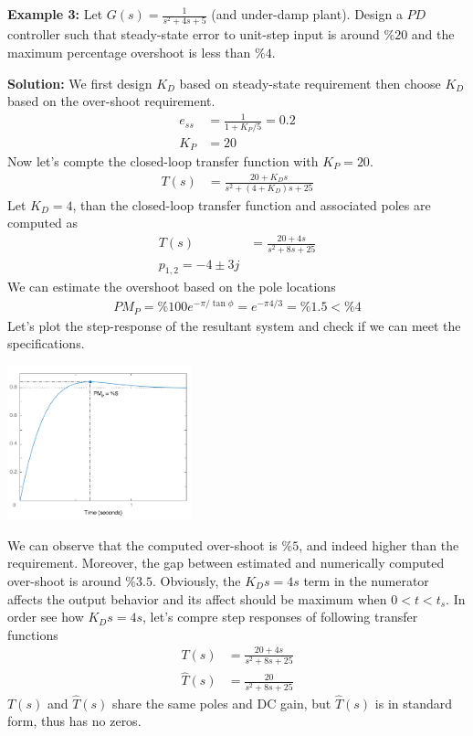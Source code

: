 \documentclass[twoside]{article}
\begin{document}
\textbf{Example 3:} Let $G(s) = \frac{1}{s^2 + 4 s + 5}$ (and under-damp
plant). Design a $PD$ controller such that steady-state error to
unit-step input is around $\% 20$ and the maximum percentage overshoot
is less than $\% 4$. 

\textbf{Solution:} We first design $K_D$ based on steady-state
requirement then choose $K_D$ based on the over-shoot requirement.
%
  \begin{align*}
    e_{ss} &= \frac{1}{1 + K_P/5} = 0.2
    \\
   K_P &= 20
  \end{align*} 
%
Now let's compte the closed-loop transfer function with $K_P = 20$.
  \begin{align*}
   T(s) &= \frac{20 + K_D s}{s^2 + (4 + K_D) s + 25}
  \end{align*} 
%
Let $K_D = 4$, than the closed-loop transfer function and associated
poles are computed as
%
  \begin{align*}
   T(s) &= \frac{20 + 4s}{s^2 + 8 s + 25}
  \\
  p_{1,2} = -4 \pm 3 j
  \end{align*} 
% 
We can estimate the overshoot based on the pole locations
%
  \begin{align*}
    PM_P = \% 100 e^{-\pi / \tan \phi} = e^{-\pi 4 / 3} = \% 1.5 < \% 4
  \end{align*} 
%
Let's plot the step-response of the resultant system and check if we
can meet the specifications.

\vspace{12 pt}

  \begin{minipage}[h]{1\linewidth}
    \begin{center}
      \includegraphics[width=0.4\textwidth]{PD1}
    \end{center}
  \end{minipage}

\vspace{12 pt}

We can observe that the computed over-shoot is $\% 5$, and indeed
higher than the requirement. Moreover, the gap between estimated
and numerically computed over-shoot is around $\%3.5$. Obviously,
the $K_D s = 4 s$ term in the numerator affects the output behavior and
its affect should be maximum when $0 < t < t_s$. In order see how
$K_D s = 4 s$, let's compre step responses of following transfer
functions
%
\begin{align*}
   T(s) &= \frac{20 + 4s}{s^2 + 8 s + 25}
  \\
   \hat{T}(s) &= \frac{20}{s^2 + 8 s + 25}
  \end{align*} 
% 
$T(s)$ and $\hat{T}(s)$ share the same poles and DC gain, but
$\hat{T}(s)$ is in standard form, thus has no zeros.
\end{document}

